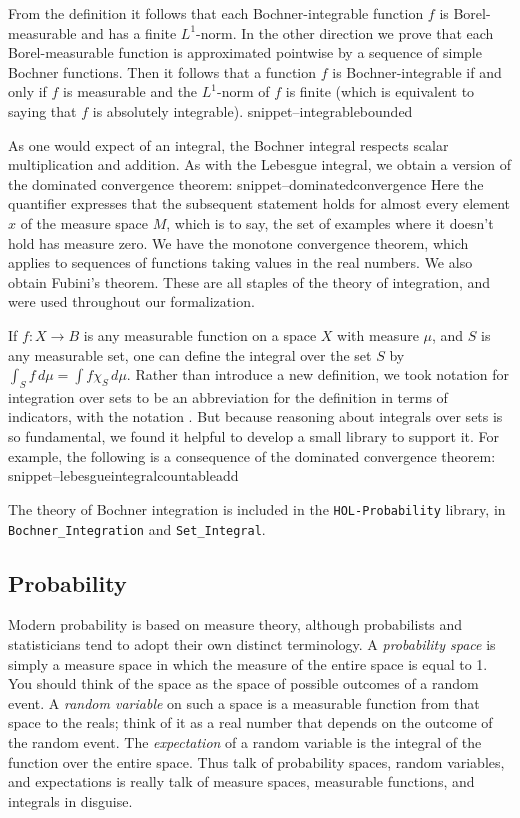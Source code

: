 \documentclass{svjour3}
\newcommand{\Snippet}[1]{\csname snippet--#1\endcsname}
\begin{document}
From the definition it follows that each Bochner-integrable function $f$ is Borel-measurable and has a finite $L^1$-norm. In the other direction we prove that each Borel-measurable function is approximated pointwise by a sequence of simple Bochner functions. Then it follows that a function $f$ is Bochner-integrable if and only if $f$ is measurable and the $L^1$-norm of $f$ is finite (which is equivalent to saying that $f$ is absolutely integrable).
\Snippet{integrablebounded}

As one would expect of an integral, the Bochner integral respects scalar multiplication and addition. As with the Lebesgue integral, we obtain a version of the dominated convergence theorem:
\Snippet{dominatedconvergence}
Here the quantifier  expresses that the subsequent statement holds for almost every element $x$ of the measure space $M$, which is to say, the set of examples where it doesn't hold has measure zero. We have the monotone convergence theorem, which applies to sequences of functions taking values in the real numbers. We also obtain Fubini's theorem. These are all staples of the theory of integration, and were used throughout our formalization.

If $f : X \to B$ is any measurable function on a space $X$ with measure $\mu$, and $S$ is any measurable set, one can define the integral over the set $S$ by $\int_S f \, d\mu = \int f \chi_S \, d\mu$. Rather than introduce a new definition, we took notation for integration over sets to be an abbreviation for the definition in terms of indicators, with the notation . But because reasoning about integrals over sets is so fundamental, we found it helpful to develop a small library to support it. For example, the following is a consequence of the dominated convergence theorem:
\Snippet{lebesgueintegralcountableadd}

The theory of Bochner integration is included in the \texttt{HOL-Probability} library, in \texttt{Bochner\_Integration} and \texttt{Set\_Integral}.

\subsection{Probability}
\label{subsection:probability}

Modern probability is based on measure theory, although probabilists and statisticians tend to adopt their own distinct terminology. A \emph{probability space} is simply a measure space in which the measure of the entire space is equal to 1. You should think of the space as the space of possible outcomes of a random event. A \emph{random variable} on such a space is a measurable function from that space to the reals; think of it as a real number that depends on the outcome of the random event. The \emph{expectation} of a random variable is the integral of the function over the entire space. Thus talk of probability spaces, random variables, and expectations is really talk of measure spaces, measurable functions, and integrals in disguise.
\end{document}
